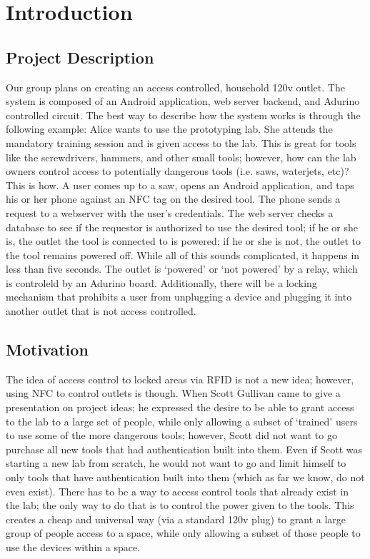\documentclass{sigchi}
\begin{document}
\section{Introduction}

\subsection {Project Description}
Our group plans on creating an access controlled, household 120v outlet. The system is composed of an Android application, web server backend, and Adurino controlled circuit. The best way to describe how the system works is through the following example: Alice wants to use the prototyping lab. She attends the mandatory training session and is given access to the lab. This is great for tools like the screwdrivers, hammers, and other small tools; however, how can the lab owners control access to potentially dangerous tools (i.e. saws, waterjets, etc)? This is how. A user comes up to a saw, opens an Android application, and taps his or her phone against an NFC tag on the desired tool. The phone sends a request to a webserver with the user’s credentials. The web server checks a database to see if the requestor is authorized to use the desired tool; if he or she is, the outlet the tool is connected to is powered; if he or she is not, the outlet to the tool remains powered off. While all of this sounds complicated, it happens in less than five seconds. The outlet is ‘powered’ or ‘not powered’ by a relay, which is controleld by an Adurino board. Additionally, there will be a locking mechanism that prohibits a user from unplugging a device and plugging it into another outlet that is not access controlled. 

\subsection {Motivation}

The idea of access control to locked areas via RFID is not a new idea; however, using NFC to control outlets is though. When Scott Gullivan came to give a presentation on project ideas; he expressed the desire to be able to grant access to the lab to a large set of people, while only allowing a subset of ‘trained’ users to use some of the more dangerous tools; however, Scott did not want to go purchase all new tools that had authentication built into them. Even if Scott was starting a new lab from scratch, he would not want to go and limit himself to only tools that have authentication built into them (which as far we know, do not even exist). There has to be a way to access control tools that already exist in the lab; the only way to do that is to control the power given to the tools. This creates a cheap and universal way (via a standard 120v plug) to grant a large group of people access to a space, while only allowing a subset of those people to use the devices within a space. 
\end{document}
